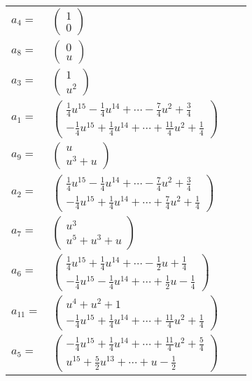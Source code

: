 \documentclass[1p]{elsarticle_modified}
\theoremstyle{definition}
\begin{document}
\begin{tabular}{m{7pt} m{180pt} m{7pt} m{180pt} }
\flushright $a_{4}=$&$\begin{pmatrix}1\\0\end{pmatrix}$ \\
\flushright $a_{8}=$&$\begin{pmatrix}0\\u\end{pmatrix}$ \\
\flushright $a_{3}=$&$\begin{pmatrix}1\\u^2\end{pmatrix}$ \\
\flushright $a_{1}=$&$\begin{pmatrix}\frac{1}{4} u^{15}-\frac{1}{4} u^{14}+\cdots-\frac{7}{4} u^2+\frac{3}{4}\\-\frac{1}{4} u^{15}+\frac{1}{4} u^{14}+\cdots+\frac{11}{4} u^2+\frac{1}{4}\end{pmatrix}$ \\
\flushright $a_{9}=$&$\begin{pmatrix}u\\u^3+u\end{pmatrix}$ \\
\flushright $a_{2}=$&$\begin{pmatrix}\frac{1}{4} u^{15}-\frac{1}{4} u^{14}+\cdots-\frac{7}{4} u^2+\frac{3}{4}\\-\frac{1}{4} u^{15}+\frac{1}{4} u^{14}+\cdots+\frac{7}{4} u^2+\frac{1}{4}\end{pmatrix}$ \\
\flushright $a_{7}=$&$\begin{pmatrix}u^3\\u^5+u^3+u\end{pmatrix}$ \\
\flushright $a_{6}=$&$\begin{pmatrix}\frac{1}{4} u^{15}+\frac{1}{4} u^{14}+\cdots-\frac{1}{2} u+\frac{1}{4}\\-\frac{1}{4} u^{15}-\frac{1}{4} u^{14}+\cdots+\frac{1}{2} u-\frac{1}{4}\end{pmatrix}$ \\
\flushright $a_{11}=$&$\begin{pmatrix}u^4+u^2+1\\-\frac{1}{4} u^{15}+\frac{1}{4} u^{14}+\cdots+\frac{11}{4} u^2+\frac{1}{4}\end{pmatrix}$ \\
\flushright $a_{5}=$&$\begin{pmatrix}-\frac{1}{4} u^{15}+\frac{1}{4} u^{14}+\cdots+\frac{11}{4} u^2+\frac{5}{4}\\u^{15}+\frac{5}{2} u^{13}+\cdots+u-\frac{1}{2}\end{pmatrix}$ \\

\end{tabular}
\end{document}
